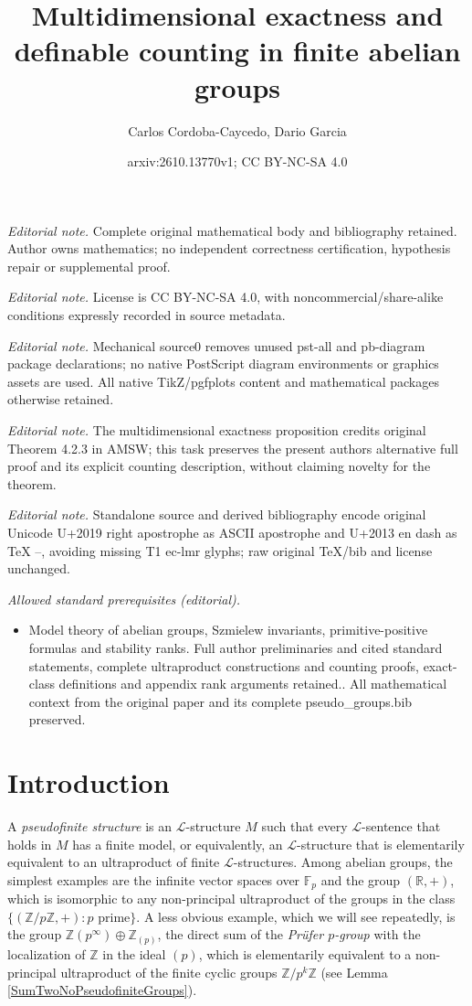 \documentclass[10pt,a4paper]{amsart}
\title{Multidimensional exactness and definable counting in finite abelian groups}
\author{Carlos Cordoba-Caycedo, Dario Garcia}
\date{arxiv:2610.13770v1; CC BY-NC-SA 4.0}
\theoremstyle{definition}
\newcommand{\Le}{\mathcal{L}}
\begin{document}
\maketitle
\noindent\textit{Editorial note.} Complete original mathematical body and bibliography retained. Author owns mathematics; no independent correctness certification, hypothesis repair or supplemental proof.\par\medskip
\noindent\textit{Editorial note.} License is CC BY-NC-SA 4.0, with noncommercial/share-alike conditions expressly recorded in source metadata.\par\medskip
\noindent\textit{Editorial note.} Mechanical source0 removes unused pst-all and pb-diagram package declarations; no native PostScript diagram environments or graphics assets are used. All native TikZ/pgfplots content and mathematical packages otherwise retained.\par\medskip
\noindent\textit{Editorial note.} The multidimensional exactness proposition credits original Theorem 4.2.3 in AMSW; this task preserves the present authors alternative full proof and its explicit counting description, without claiming novelty for the theorem.\par\medskip
\noindent\textit{Editorial note.} Standalone source and derived bibliography encode original Unicode U+2019 right apostrophe as ASCII apostrophe and U+2013 en dash as TeX --, avoiding missing T1 ec-lmr glyphs; raw original TeX/bib and license unchanged.\par\medskip
\noindent\textit{Allowed standard prerequisites (editorial).}\begin{itemize}
\item Model theory of abelian groups, Szmielew invariants, primitive-positive formulas and stability ranks. Full author preliminaries and cited standard statements, complete ultraproduct constructions and counting proofs, exact-class definitions and appendix rank arguments retained.. All mathematical context from the original paper and its complete pseudo\_groups.bib preserved.
\end{itemize}\medskip
\section{Introduction}

A \emph{pseudofinite structure} is an $\Le$-structure $M$ such that every
$\Le$-sentence that holds in $M$ has a finite model, or equivalently, an
$\Le$-structure that is elementarily equivalent to an ultraproduct of finite
$\Le$-structures. Among abelian groups, the simplest examples are the infinite vector
spaces over $\mathbb{F}_p$ and the group $(\mathbb{R},+)$, which is
isomorphic to any non-principal ultraproduct of the groups in the class
$\{(\mathbb{Z}/p\mathbb{Z},+) : p \text{ prime}\}$. A less obvious example,
which we will see repeatedly, is the group
$\mathbb{Z}(p^\infty)\oplus\mathbb{Z}_{(p)}$, the direct sum of the \emph{Prüfer $p$-group} with the localization of $\mathbb{Z}$ in the ideal $(p)$, which is elementarily
equivalent to a non-principal ultraproduct of the finite cyclic groups
$\mathbb{Z}/p^k\mathbb{Z}$ (see Lemma \ref{SumTwoNoPseudofiniteGroups}).\\
\end{document}

